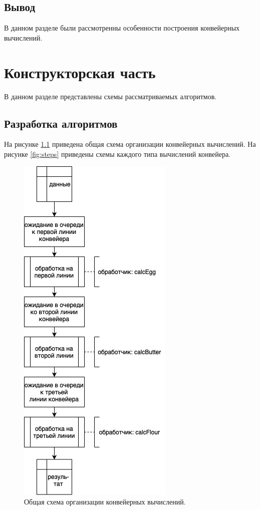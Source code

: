 \documentclass[12pt]{report}
\begin{document}
\section*{Вывод}
В данном разделе были рассмотренны особенности построения конвейерных вычислений.

\chapter{Конструкторская часть}

В данном разделе представлены схемы рассматриваемых алгоритмов.

\section{Разработка алгоритмов}

На рисунке \ref{fig:com} приведена общая схема организации конвейерных вычислений. На рисунке \ref{fig:steps} приведены схемы каждого типа вычислений конвейера.

\begin{figure}[h]
	\centering
	\includegraphics[scale = 0.6]{common.jpg}
	\caption{Общая схема организации конвейерных вычислений.}
	\label{fig:com}
\end{figure}
\end{document}
